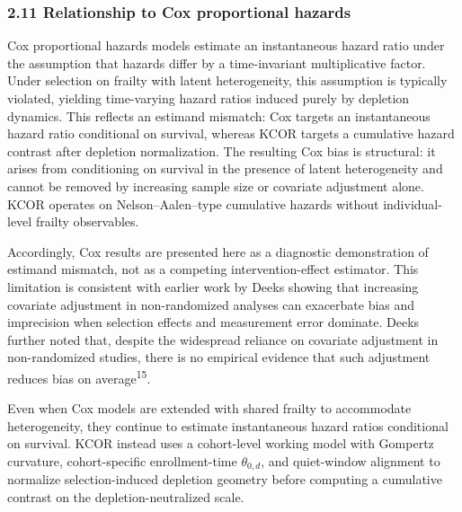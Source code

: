 \documentclass[
]{article}
\begin{document}
\subsubsection{2.11 Relationship to Cox proportional
hazards}\label{relationship-to-cox-proportional-hazards}

Cox proportional hazards models estimate an instantaneous hazard ratio
under the assumption that hazards differ by a time-invariant
multiplicative factor. Under selection on frailty with latent
heterogeneity, this assumption is typically violated, yielding
time-varying hazard ratios induced purely by depletion dynamics. This
reflects an estimand mismatch: Cox targets an instantaneous hazard ratio
conditional on survival, whereas KCOR targets a cumulative hazard
contrast after depletion normalization. The resulting Cox bias is
structural: it arises from conditioning on survival in the presence of
latent heterogeneity and cannot be removed by increasing sample size or
covariate adjustment alone. KCOR operates on Nelson--Aalen--type
cumulative hazards without individual-level frailty observables.

Accordingly, Cox results are presented here as a diagnostic
demonstration of estimand mismatch, not as a competing
intervention-effect estimator. This limitation is consistent with
earlier work by Deeks showing that increasing covariate adjustment in
non-randomized analyses can exacerbate bias and imprecision when
selection effects and measurement error dominate. Deeks further noted
that, despite the widespread reliance on covariate adjustment in
non-randomized studies, there is no empirical evidence that such
adjustment reduces bias on average\textsuperscript{15}.

Even when Cox models are extended with shared frailty to accommodate
heterogeneity, they continue to estimate instantaneous hazard ratios
conditional on survival. KCOR instead uses a cohort-level working model
with Gompertz curvature, cohort-specific enrollment-time
\(\theta_{0,d}\), and quiet-window alignment to normalize
selection-induced depletion geometry before computing a cumulative
contrast on the depletion-neutralized scale.
\end{document}
